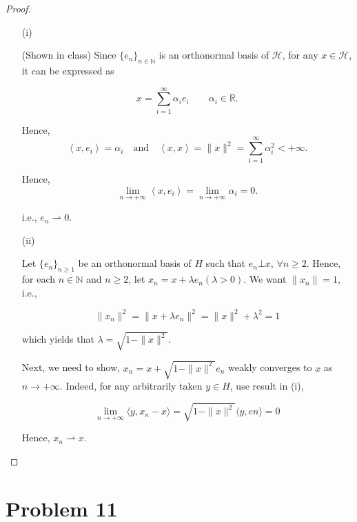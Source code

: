 \documentclass[12pt]{article}
\begin{document}
\begin{proof}

\begin{enumerate}
\item [(i)]

(Shown in class) Since $\{e_n\}_{n\in \mathbb N}$ is an orthonormal basis of $\mathcal H$, for any $x\in \mathcal H$, it can be expressed as

$$
x = \sum_{i=1}^\infty \alpha_i e_i \qquad \alpha_i \in \mathbb R.
$$

Hence, 
$$
\left\langle x, e_i  \right\rangle = \alpha_i \quad \text{and} \quad \left\langle x, x  \right\rangle = \|x\|^2 = \sum_{i=1}^\infty\alpha_i ^2 < +\infty.
$$

Hence, 
$$
\lim_{n\rightarrow +\infty} \left\langle x, e_i  \right\rangle = \lim_{n\rightarrow +\infty} \alpha_i = 0.
$$

i.e., $e_n \rightharpoonup 0$.

\item [(ii)]

Let $\{e_n\}_{n\geqslant1}$ be an orthonormal  basis of $H$ such that $e_n \bot x$, $\forall n\geqslant 2$. Hence, for each $n\in \mathbb N$ and $n\geqslant 2$, let $x_n = x + \lambda e_n (\lambda > 0)$. We want $\|x_n\| = 1$, i.e.,

$$
\|x_n\|^2 = \|x + \lambda e_n\|^2 = \|x\|^2 + \lambda^2 = 1
$$

which yields that $\lambda = \sqrt{1 - \|x\|^2}$. 

Next, we need to show, $x_n = x + \sqrt{1 - \|x\|^2} e_n$ weakly converges to $x$ as $n\rightarrow +\infty$. Indeed, for any arbitrarily taken $y\in H$, use result in (i),

$$
\lim_{n\rightarrow +\infty} \langle y, x_n - x \rangle = \sqrt{1 - \|x\|^2} \langle y, en \rangle = 0
$$

Hence, $x_n \rightharpoonup x$.

\end{enumerate}

\end{proof}



\section*{Problem 11}
\end{document}
